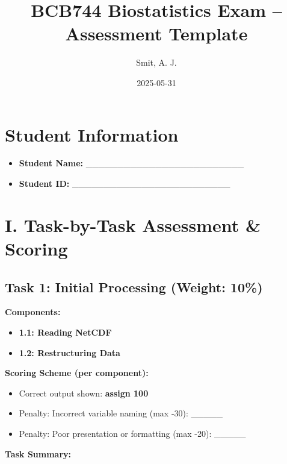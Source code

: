 \documentclass[
  10pt,
]{article}
\title{BCB744 Biostatistics Exam -- Assessment Template}
\author{Smit, A. J.}
\date{2025-05-31}
\providecommand{\tightlist}{%
  \setlength{\itemsep}{0pt}\setlength{\parskip}{0pt}}
\begin{document}
\maketitle


\section{Student Information}\label{student-information}

\begin{itemize}
\tightlist
\item
  \textbf{Student Name:}
  \_\_\_\_\_\_\_\_\_\_\_\_\_\_\_\_\_\_\_\_\_\_\_\_\_\\
\item
  \textbf{Student ID:}
  \_\_\_\_\_\_\_\_\_\_\_\_\_\_\_\_\_\_\_\_\_\_\_\_\_
\end{itemize}

\section{I. Task-by-Task Assessment \&
Scoring}\label{i.-task-by-task-assessment-scoring}

\subsection{Task 1: Initial Processing (Weight:
10\%)}\label{task-1-initial-processing-weight-10}

\textbf{Components:}

\begin{itemize}
\tightlist
\item
  \textbf{1.1: Reading NetCDF}\\
\item
  \textbf{1.2: Restructuring Data}
\end{itemize}

\textbf{Scoring Scheme (per component):}

\begin{itemize}
\tightlist
\item
  Correct output shown: \textbf{assign 100}\\
\item
  Penalty: Incorrect variable naming (max -30): \_\_\_\_\_\\
\item
  Penalty: Poor presentation or formatting (max -20): \_\_\_\_\_
\end{itemize}

\textbf{Task Summary:}
\end{document}
